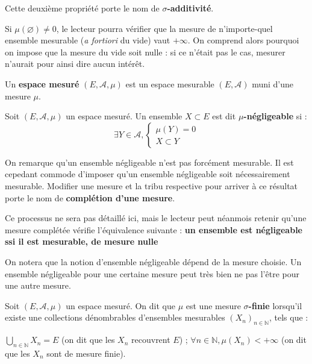\documentclass[../integ-proba.tex]{subfiles}
\begin{document}
  \begin{rem}
    Cette deuxième propriété porte le nom de $\sigma$\textbf{-additivité}.
  \end{rem}

  \begin{rem}
    Si $\mu(\varnothing) \neq 0$, le lecteur pourra vérifier que la mesure de n'importe-quel ensemble mesurable (\textit{a fortiori} du vide) vaut $+\infty$.
    On comprend alors pourquoi on impose que la mesure du vide soit nulle : si ce n'était pas le cas, mesurer n'aurait pour ainsi dire aucun intérêt.
  \end{rem}

  \begin{defi}
    Un \textbf{espace mesuré} $\left(E, \mathcal{A}, \mu\right)$ est un espace mesurable $\left(E, \mathcal{A}\right)$ muni d'une mesure $\mu$.
  \end{defi}

  \begin{defi}
    Soit $\left(E, \mathcal{A}, \mu\right)$ un espace mesuré.
    Un ensemble $X \subset E$ est dit $\mu$\textbf{-négligeable} si :
    $$\exists Y \in \mathcal{A},
    \left\{
      \begin{array}{c}
        \mu(Y)=0\\
        X \subset Y
      \end{array}
      \right.$$
  \end{defi}

  \begin{rem}
    \label{rem:completion}
    On remarque qu'un ensemble négligeable n'est pas forcément mesurable.
    Il est cepedant commode d'imposer qu'un ensemble négligeable soit nécessairement mesurable.
    Modifier une mesure et la tribu respective pour arriver à ce résultat porte le nom de \textbf{complétion d'une mesure}.

    Ce processus ne sera pas détaillé ici, mais le lecteur peut néanmois retenir qu'une mesure complétée vérifie l'équivalence suivante : \textbf{un ensemble est négligeable ssi il est mesurable, de mesure nulle}
  \end{rem}

  \begin{rem}
    On notera que la notion d'ensemble négligeable dépend de la mesure choisie.
    Un ensemble négligeable pour une certaine mesure peut très bien ne pas l'être pour une autre mesure.
  \end{rem}

  \begin{defi}
    Soit $\left(E, \mathcal{A}, \mu\right)$ un espace mesuré.
    On dit que $\mu$ est une mesure $\sigma$\textbf{-finie} lorsqu'il existe une collections dénombrables d'ensembles mesurables $\left(X_n\right)_{n \in \mathbb{N}}$, tels que :
    \begin{itemize}
      \itemb $\displaystyle \bigcup_{n \in \mathbb{N}} X_n = E$ (on dit que les $X_n$ recouvrent $E$) ;
      \itemb $\forall n \in \mathbb{N}, \mu(X_n) < + \infty$ (on dit que les $X_n$ sont de mesure finie).
    \end{itemize}
  \end{defi}
\end{document}
